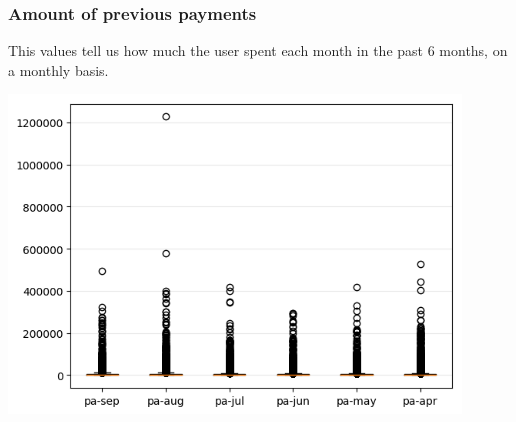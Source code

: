 \documentclass[a4paper]{article}
\begin{document}
\subsubsection{Amount of previous payments}
This values tell us how much the user spent each month in the past 6 months, on a monthly basis.
\begin{center}
\includegraphics[width=0.9\textwidth]{../Code/Gemma/boxplots/pa.png}
\end{center}
\end{document}
